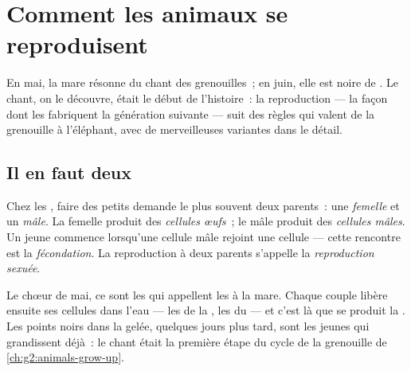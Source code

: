 \chapter{Comment les animaux se reproduisent}\label{ch:g4:animal-reproduction}

En mai, la mare résonne du chant des grenouilles~; en juin, elle est
noire de . Le chant, on le découvre, était le début de
l'histoire~: la reproduction --- la façon dont les 
fabriquent la génération suivante --- suit des règles qui valent de
la grenouille à l'éléphant, avec de merveilleuses variantes dans le
détail.

\section{Il en faut deux}

\begin{definition}\label{def:g4:animal-reproduction:sexual}
Chez les , faire des petits demande le plus souvent deux
parents~: une \emph{femelle} et un
\emph{mâle}. La femelle produit des \emph{cellules
œufs}~; le mâle produit des \emph{cellules
mâles}. Un jeune  commence lorsqu'une
cellule mâle rejoint une cellule  --- cette rencontre est la
\emph{fécondation}. La reproduction à deux
parents s'appelle la \emph{reproduction
sexuée}.
\end{definition}

\begin{example}\label{ex:g4:animal-reproduction:song}
Le chœur de mai, ce sont les  qui appellent les  à la
mare. Chaque couple libère ensuite ses cellules dans l'eau --- les
 de la , les  du  --- et c'est là que
se produit la . Les points noirs dans la gelée, quelques
jours plus tard, sont les jeunes qui grandissent déjà~: le chant
était la première étape du cycle de la grenouille de
\cref{ch:g2:animals-grow-up}.
\end{example}

